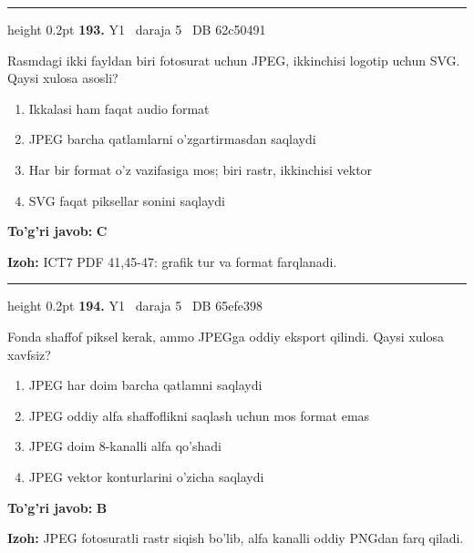 \documentclass[10pt,a4paper,oneside]{article}
\begin{document}
\vspace{2mm}\hrule height 0.2pt \vspace{4mm}
\hypertarget{q193}{\textbf{\color{ink}193.}}  {\color{muted}\scriptsize Y1 \textbullet\ daraja 5 \textbullet\ DB 62c50491}
\par
Rasmdagi ikki fayldan biri fotosurat uchun JPEG, ikkinchisi logotip uchun SVG. Qaysi xulosa asosli?
\begin{enumerate}[label=\Alph*),leftmargin=9mm]
\item Ikkalasi ham faqat audio format
\item JPEG barcha qatlamlarni o'zgartirmasdan saqlaydi
\item Har bir format o'z vazifasiga mos; biri rastr, ikkinchisi vektor
\item SVG faqat piksellar sonini saqlaydi
\end{enumerate}
\begin{tcolorbox}[enhanced,breakable,colback=teal!4,colframe=teal!45!black,boxrule=0.45pt,arc=1.2mm,left=2.8mm,right=2.8mm,top=2mm,bottom=2mm,before skip=2mm,after skip=2mm]
\textbf{\color{teal}To'g'ri javob:} \textbf{C}
\par\smallskip
\textbf{Izoh:} ICT7 PDF 41,45-47: grafik tur va format farqlanadi.
\end{tcolorbox}
\vspace{2mm}\hrule height 0.2pt \vspace{4mm}
\hypertarget{q194}{\textbf{\color{ink}194.}}  {\color{muted}\scriptsize Y1 \textbullet\ daraja 5 \textbullet\ DB 65efe398}
\par
Fonda shaffof piksel kerak, ammo JPEGga oddiy eksport qilindi. Qaysi xulosa xavfsiz?
\begin{enumerate}[label=\Alph*),leftmargin=9mm]
\item JPEG har doim barcha qatlamni saqlaydi
\item JPEG oddiy alfa shaffoflikni saqlash uchun mos format emas
\item JPEG doim 8-kanalli alfa qo'shadi
\item JPEG vektor konturlarini o'zicha saqlaydi
\end{enumerate}
\begin{tcolorbox}[enhanced,breakable,colback=teal!4,colframe=teal!45!black,boxrule=0.45pt,arc=1.2mm,left=2.8mm,right=2.8mm,top=2mm,bottom=2mm,before skip=2mm,after skip=2mm]
\textbf{\color{teal}To'g'ri javob:} \textbf{B}
\par\smallskip
\textbf{Izoh:} JPEG fotosuratli rastr siqish bo'lib, alfa kanalli oddiy PNGdan farq qiladi.
\end{tcolorbox}
\end{document}
